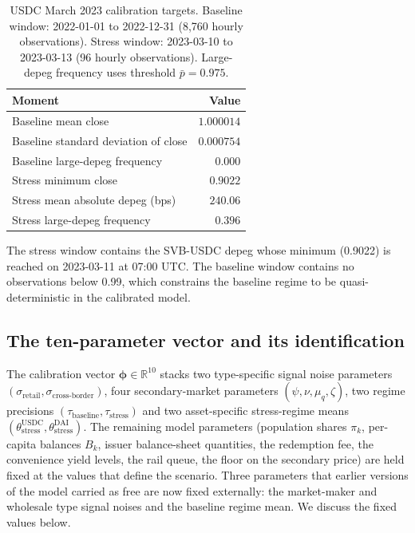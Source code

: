 \begin{table}[h]
\centering
\caption{USDC March 2023 calibration targets. Baseline window: 2022-01-01 to 2022-12-31 (8,760 hourly observations). Stress window: 2023-03-10 to 2023-03-13 (96 hourly observations). Large-depeg frequency uses threshold $\bar{p} = 0.975$.}
\label{tab:targets}
\begin{tabular}{lr}
\toprule
Moment & Value \\
\midrule
Baseline mean close & $1.000014$ \\
Baseline standard deviation of close & $0.000754$ \\
Baseline large-depeg frequency & $0.000$ \\
Stress minimum close & $0.9022$ \\
Stress mean absolute depeg (bps) & $240.06$ \\
Stress large-depeg frequency & $0.396$ \\
\bottomrule
\end{tabular}
\end{table}

The stress window contains the SVB-USDC depeg whose minimum (0.9022) is reached on 2023-03-11 at 07:00 UTC. The baseline window contains no observations below 0.99, which constrains the baseline regime to be quasi-deterministic in the calibrated model.

\subsection{The ten-parameter vector and its identification}\label{sub:identification}

The calibration vector $\boldsymbol{\phi} \in \mathbb{R}^{10}$ stacks two type-specific signal noise parameters $(\sigma_{\text{retail}}, \sigma_{\text{cross-border}})$, four secondary-market parameters $(\psi, \nu, \mu_q, \zeta)$, two regime precisions $(\tau_{\text{baseline}}, \tau_{\text{stress}})$ and two asset-specific stress-regime means $(\theta_{\text{stress}}^{\text{USDC}}, \theta_{\text{stress}}^{\text{DAI}})$. The remaining model parameters (population shares $\pi_k$, per-capita balances $B_k$, issuer balance-sheet quantities, the redemption fee, the convenience yield levels, the rail queue, the floor on the secondary price) are held fixed at the values that define the scenario. Three parameters that earlier versions of the model carried as free are now fixed externally: the market-maker and wholesale type signal noises and the baseline regime mean. We discuss the fixed values below.

